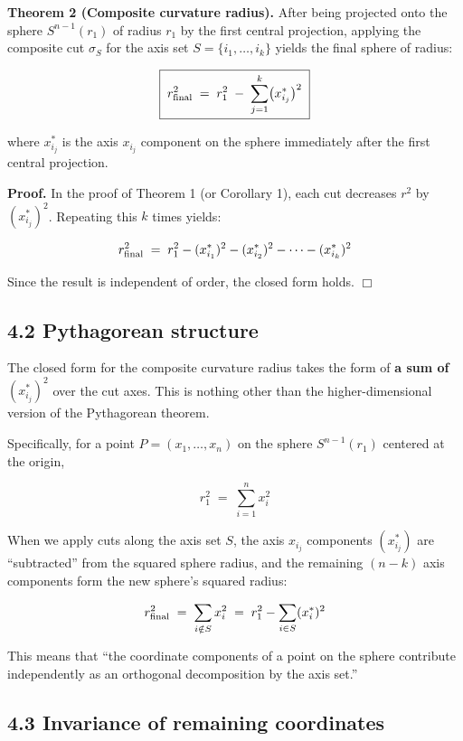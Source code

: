 \documentclass[a4paper,11pt]{article}
\theoremstyle{definition}
\theoremstyle{remark}
\begin{document}
\textbf{Theorem 2 (Composite curvature radius).} After being projected
onto the sphere \(S^{n-1}(r_1)\) of radius \(r_1\) by the first central
projection, applying the composite cut \(\sigma_S\) for the axis set
\(S = \{i_1, \ldots, i_k\}\) yields the final sphere of radius:

\[
\boxed{\;r_{\rm final}^{2} \;=\; r_{1}^{2} \;-\; \sum_{j=1}^{k}\bigl(x_{i_j}^{*}\bigr)^{2}\;}
\]

where \(x_{i_j}^{*}\) is the axis \(x_{i_j}\) component on the sphere
immediately after the first central projection.

\textbf{Proof.} In the proof of Theorem 1 (or Corollary 1), each cut
decreases \(r^2\) by \((x_{i_j}^{*})^2\). Repeating this \(k\) times
yields:

\[
r_{\rm final}^{2} \;=\; r_{1}^{2} - (x_{i_1}^{*})^{2} - (x_{i_2}^{*})^{2} - \cdots - (x_{i_k}^{*})^{2}
\]

Since the result is independent of order, the closed form holds.
\(\Box\)

\subsection{4.2 Pythagorean structure}\label{pythagorean-structure}

The closed form for the composite curvature radius takes the form of
\textbf{a sum of \((x_{i_j}^{*})^2\)} over the cut axes. This is nothing
other than the higher-dimensional version of the Pythagorean theorem.

Specifically, for a point \(P = (x_1, \ldots, x_n)\) on the sphere
\(S^{n-1}(r_1)\) centered at the origin,

\[
r_1^{2} \;=\; \sum_{i=1}^{n} x_i^{2}
\]

When we apply cuts along the axis set \(S\), the axis \(x_{i_j}\)
components \((x_{i_j}^{*})\) are ``subtracted'' from the squared sphere
radius, and the remaining \((n-k)\) axis components form the new
sphere's squared radius:

\[
r_{\rm final}^{2} \;=\; \sum_{i \notin S} x_i^{2} \;=\; r_1^{2} - \sum_{i \in S} (x_i^{*})^{2}
\]

This means that ``the coordinate components of a point on the sphere
contribute independently as an orthogonal decomposition by the axis
set.''

\subsection{4.3 Invariance of remaining
coordinates}\label{invariance-of-remaining-coordinates}
\end{document}
